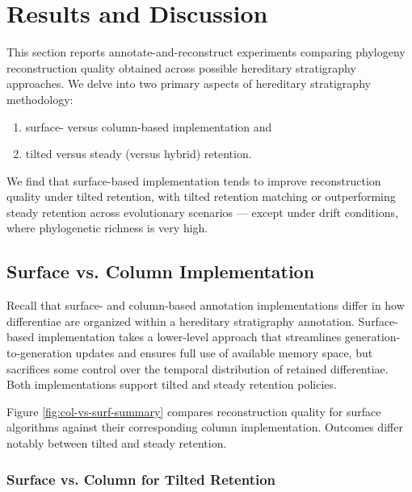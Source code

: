 \section{Results and Discussion} \label{sec:results}

This section reports annotate-and-reconstruct experiments comparing phylogeny reconstruction quality obtained across possible hereditary stratigraphy approaches.
We delve into two primary aspects of hereditary stratigraphy methodology:
\begin{enumerate}
\item surface- versus column-based implementation and
\item tilted versus steady (versus hybrid) retention.
\end{enumerate}

We find that surface-based implementation tends to improve reconstruction quality under tilted retention, with tilted retention matching or outperforming steady retention across evolutionary scenarios --- except under drift conditions, where phylogenetic richness is very high.

\subsection{Surface vs. Column Implementation} \label{sec:surface-vs-column}



Recall that surface- and column-based annotation implementations differ in how differentiae are organized within a hereditary stratigraphy annotation.
Surface-based implementation takes a lower-level approach that streamlines generation-to-generation updates and ensures full use of available memory space, but sacrifices some control over the temporal distribution of retained differentiae.
Both implementations support tilted and steady retention policies.

Figure \ref{fig:col-vs-surf-summary} compares reconstruction quality for surface algorithms against their corresponding column implementation.
Outcomes differ notably between tilted and steady retention.

\subsubsection{Surface vs. Column for Tilted Retention}

